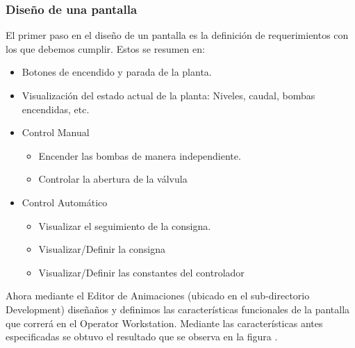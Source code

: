 \subsubsection{Diseño de una pantalla}
El primer paso en el diseño de un pantalla es la definición de requerimientos 
con los que debemos cumplir. Estos se resumen en:
\begin{itemize}
 \item Botones de encendido y parada de la planta.
 \item Visualización del estado actual de la planta: Niveles, caudal, bombas 
 encendidas, etc.
 \item Control Manual
 \begin{itemize}
  \item Encender las bombas de manera independiente.
  \item Controlar la abertura de la válvula
 \end{itemize}
 \item Control Automático
 \begin{itemize}
  \item Visualizar el seguimiento de la consigna.
  \item Visualizar/Definir la consigna
  \item Visualizar/Definir las constantes del controlador
 \end{itemize}
\end{itemize}

Ahora mediante el Editor de Animaciones (ubicado en el sub-directorio 
Development) diseñaños y definimos las características funcionales de 
la pantalla que correrá en el Operator Workstation. Mediante las 
características antes especificadas se obtuvo el resultado que se observa en la 
figura . 

